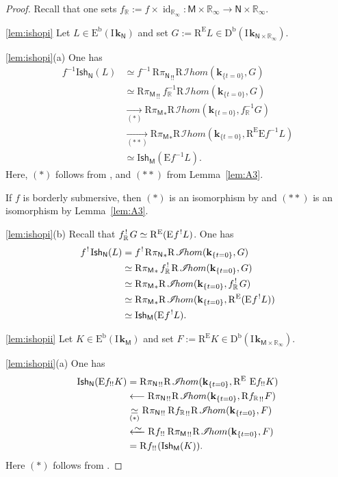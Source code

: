 \documentclass[JEP,XML,SOM,Unicode]{cedram}
\let\mathcal\mathscr
\newcommand\from{\mathchoice{\longleftarrow}{\leftarrow}{\leftarrow}{\leftarrow}}
\newcommand{\isofrom}[1][]{\xleftarrow[#1]%
{\raisebox{-.4ex}[0ex][-.4ex]{$\mspace{2mu}\sim\mspace{2mu}$}}}
\theoremstyle{plain}
\theoremstyle{definition}
\newcommand{\R}{\mathbb{R}}
\newcommand{\bR}{{\R_\infty}}
\newcommand{\derived}[1]{\mathrm{#1}}
\newcommand{\derd}{\derived{D}}
\newcommand{\dere}{\derived{E}}\let\enh\dere
\newcommand{\derr}{\derived{R}}
\newcommand{\BDC}{\derd^{\mathrm{b}}}
\newcommand{\BEC}[2][\ifield]{\dere^{\mathrm{b}}(#1_{#2})}
\newcommand{\roim}[1]{\derr#1_*}
\newcommand{\reeim}[1]{\derr#1_{\mspace{1mu}!!}\mspace{1mu}}
\newcommand{\rihom}{{\derr\mspace{2mu}\shi\!hom}}
\newcommand{\epb}[1]{#1^{\mspace{1.5mu}!}\mspace{2mu}}
\newcommand{\sheaffont}[1]{\mathcal{#1}}
\newcommand\shi{\sheaffont{I}}
\newcommand{\RE}{\operatorname{R^\enh}}
\newcommand{\Eopb}[1]{\enh#1^{-1}}
\newcommand{\Eeeim}[1]{\enh#1_{!!}}
\newcommand{\Eepb}[1]{\enh\mspace{1mu}#1^{\mspace{1.5mu}!}}
\DeclareMathOperator{\id}{id}
\newcommand{\field}{\mathbf{k}}\let\cor\field
\newcommand{\ind}{\mathrm{I}\mspace{2mu}}
\newcommand{\ifield}{\ind\field}
\newcommand{\Ish}{\mathrm{I}\mathsf{sh}}
\newcommand{\bbM}{\mathsf{M}}
\newcommand{\bbN}{\mathsf{N}}
\newcommand{\defeq}{\mathbin{:=}}\let \seteq\defeq
\newcommand{\st}[1]{{\{{#1}\}}}
\newcommand{\opb}[1]{#1^{-1}}
\begin{document}
\begin{proof}
Recall that one sets $f_\R \defeq f\times\id_\bR\colon \bbM\times\bR\to \bbN\times\bR$.

\eqref{lem:ishopi} Let $L\in\BEC\bbN$ and set $G\defeq\RE L\in\BDC(\ifield_{\bbN\times\bR})$.

\eqref{lem:ishopi}(a) One has
\begin{align*}
\opb f \Ish_{\bbN}(L)
&\simeq \opb f \,\reeim{{\pi_\bbN}} \rihom(\field_{\st{t=0}},G) \\
&\simeq\reeim{{\pi_\bbM}} \,\opb f_\R \rihom(\field_{\st{t=0}},G) \\
&\underset{(*)}\to \roim{{\pi_\bbM}} \rihom(\field_{\st{t=0}},\opb f_\R G) \\
&\underset{(**)}\to \roim{{\pi_\bbM}} \rihom(\field_{\st{t=0}},\RE\Eopb f L) \\
&\simeq \Ish_{\bbM}(\Eopb f L).
\end{align*}
Here, $(*)$ follows from \cite[Prop.\,3.3.13]{DK16},
and $(**)$ from Lemma~\ref{lem:A3}.

If $f$ is borderly submersive,
then $(*)$ is an isomorphism by \cite[Prop.\,3.3.19]{DK16}
and $(**)$ is an isomorphism by Lemma~\ref{lem:A3}.

\eqref{lem:ishopi}(b) Recall that $\epb{f_\R}G \simeq \RE(\Eepb f L)$. One has
\begin{align*}
\epb f \Ish_{\bbN}(L)
&= \epb f \roim{{\pi_\bbN}} \rihom(\field_{\st{t=0}},G) \\
&\simeq \roim{{\pi_\bbM}}\, \epb{f_\R} \rihom(\field_{\st{t=0}},G) \\
&\simeq \roim{{\pi_\bbM}} \rihom(\field_{\st{t=0}},\epb{f_\R} G) \\
&\simeq \roim{{\pi_\bbM}} \rihom(\field_{\st{t=0}},\RE(\Eepb f L)) \\
&\simeq \Ish_{\bbM} (\Eepb f L).
\end{align*}

\eqref{lem:ishopii}
Let $K\in\BEC\bbM$ and set $F\defeq\RE K\in\BDC(\ifield_{\bbM\times\bR})$.

\eqref{lem:ishopii}(a)
One has
\begin{align*}
\Ish_{\bbN}(\Eeeim f K)
&=\reeim{{\pi_\bbN}} \rihom(\field_{\st{t=0}}, \RE\,\Eeeim f K) \\
&\from \reeim{{\pi_\bbN}} \rihom(\field_{\st{t=0}}, \reeim{{f_\R}}F) \\
&\underset{(*)}\simeq \reeim{{\pi_\bbN}}\, \reeim{{f_\R}}\rihom(\field_{\st{t=0}}, F) \\
&\isofrom \reeim f\,\reeim{{\pi_\bbM}} \rihom(\field_{\st{t=0}}, F) \\
&= \reeim f (\Ish_{\bbM}(K)).
\end{align*}
Here $(*)$ follows from \cite[Lem.\,5.2.8]{KS01}.


\end{proof}
\end{document}
